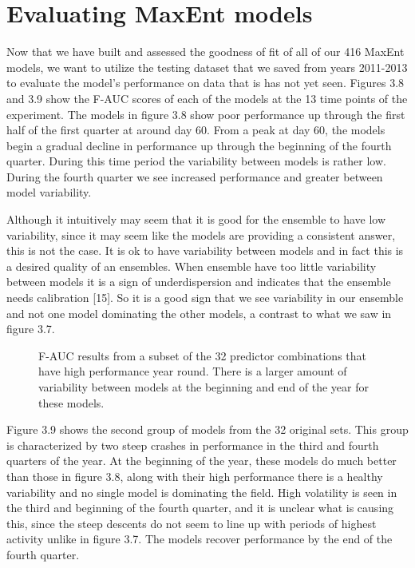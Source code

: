 \section{Evaluating MaxEnt models}

Now that we have built and assessed the goodness of fit of all of our 416 MaxEnt models, we want to utilize the testing dataset that we saved from years 2011-2013 to evaluate the model's performance on data that is has not yet seen. Figures 3.8 and 3.9 show the F-AUC scores of each of the models at the 13 time points of the experiment. The models in figure 3.8 show poor performance up through the first half of the first quarter at around day 60. From a peak at day 60, the models begin a gradual decline in performance up through the beginning of the fourth quarter. During this time period the variability between models is rather low. During the fourth quarter we see increased performance and greater between model variability. \newline

\noindent Although it intuitively may seem that it is good for the ensemble to have low variability, since it may seem like the models are providing a consistent answer, this is not the case. It is ok to have variability between models and in fact this is a desired quality of an ensembles. When ensemble have too little variability between models it is a sign of underdispersion and indicates that the ensemble needs calibration [15]. So it is a good sign that we see variability in our ensemble and not one model dominating the other models, a contrast to what we saw in figure 3.7. \newline


\begin{figure} [!ht]
\centerline{}
\caption{F-AUC results from a subset of the 32 predictor combinations that have high performance year round. There is a larger amount of variability between models at the beginning and end of the year for these models.}
\label{fig6}
\end{figure}

\noindent Figure 3.9 shows the second group of models from the 32 original sets. This group is characterized by two steep crashes in performance in the third and fourth quarters of the year. At the beginning of the year, these models do much better than those in figure 3.8, along with their high performance there is a healthy variability and no single model is dominating the field. High volatility is seen in the third and beginning of the fourth quarter, and it is unclear what is causing this, since the steep descents do not seem to line up with periods of highest activity unlike in figure 3.7.  The models recover performance by the end of the fourth quarter. \newline


